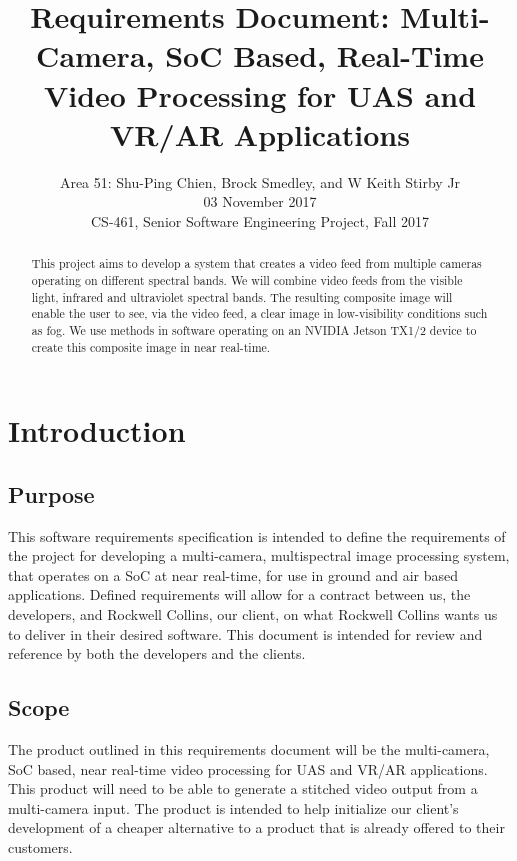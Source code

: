 \documentclass[letterpaper,10pt,serif,draftclsnofoot,onecolumn,compsoc,titlepage]{IEEEtran}
\title{Requirements Document: Multi-Camera, SoC Based, Real-Time Video Processing for UAS and VR/AR Applications}
\author{Area 51: Shu-Ping Chien, Brock Smedley, and W Keith Stirby Jr \\ 03 November 2017 \\ CS-461, Senior Software Engineering Project, Fall 2017}
\begin{document}
\begin{titlepage}
\maketitle
\begin{abstract}

This project aims to develop a system that creates a video feed from multiple cameras 
operating on different spectral bands. We will combine video feeds from the
visible light, infrared and ultraviolet spectral bands. The resulting composite image 
will enable the user to see, via the video feed, a clear image in low-visibility 
conditions such as fog. We use methods in software operating on an NVIDIA Jetson 
TX1/2 device to create this composite image in near real-time.\\

\thispagestyle{empty}
\end{abstract}
\end{titlepage}
\newpage

\tableofcontents
\newpage

\section{Introduction}

\subsection{Purpose}

This software requirements specification is intended to define the requirements of the 
project for developing a multi-camera, multispectral image processing system, that 
operates on a SoC at near real-time, for use in ground and air based 
applications. Defined requirements will allow for a contract between us, the 
developers, and Rockwell Collins, our client, on what Rockwell Collins wants us to 
deliver in their desired software. This document is intended for review and reference 
by both the developers and the clients.\\

\subsection{Scope}

The product outlined in this requirements document will be the multi-camera, SoC based,
 near real-time video processing for UAS and VR/AR applications. This product will need to 
 be able to generate a stitched video output from a multi-camera input. The product is 
 intended to help initialize our client's development of a cheaper alternative to a 
 product that is already offered to their customers.\\
\end{document}
